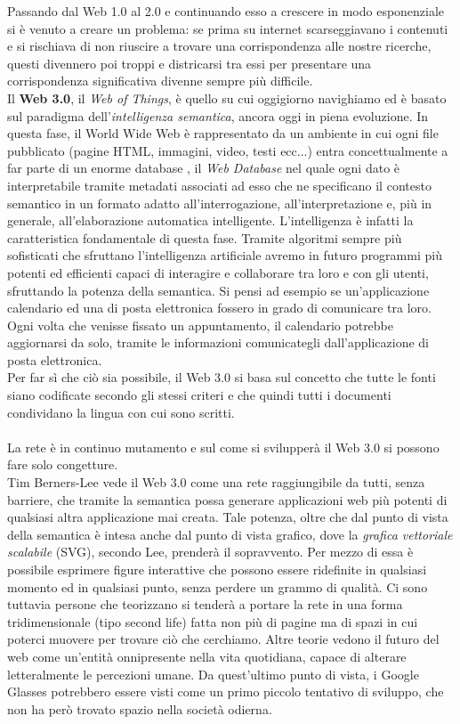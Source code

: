 \documentclass[a4paper, 11pt, oneside]{book}
\theoremstyle{plain}
\begin{document}
Passando dal Web 1.0 al 2.0 e continuando esso a crescere in modo esponenziale si è venuto a creare un problema: se prima su internet scarseggiavano i contenuti e si rischiava di non riuscire a trovare una corrispondenza alle nostre ricerche, questi divennero poi troppi e districarsi tra essi per presentare una corrispondenza significativa divenne sempre più difficile.\\
Il \textbf{Web 3.0}, il \textit{Web of Things}, è quello su cui oggigiorno navighiamo ed è basato sul paradigma dell'\textit{intelligenza semantica}, ancora oggi in piena evoluzione. In questa fase, il World Wide Web è rappresentato da un ambiente in cui ogni file pubblicato (pagine HTML, immagini, video, testi ecc...) entra concettualmente a far parte di un enorme database , il\textit{ Web Database} nel quale ogni dato è interpretabile tramite metadati associati ad esso che ne specificano il contesto semantico in un formato adatto all'interrogazione, all'interpretazione e, più in generale, all'elaborazione automatica intelligente. L'intelligenza è infatti la caratteristica fondamentale di questa fase. Tramite algoritmi sempre più sofisticati che sfruttano l'intelligenza artificiale avremo in futuro programmi più potenti ed efficienti capaci di interagire e collaborare tra loro e con gli utenti, sfruttando la potenza della semantica. Si pensi ad esempio se un'applicazione calendario ed una di posta elettronica fossero in grado di comunicare tra loro. Ogni volta che venisse fissato un appuntamento, il calendario potrebbe aggiornarsi da solo, tramite le informazioni comunicategli dall'applicazione di posta elettronica.\\ Per far sì che ciò sia possibile, il Web 3.0 si basa sul concetto che tutte le fonti siano codificate secondo gli stessi criteri e che quindi tutti i documenti condividano la lingua con cui sono scritti. \\\\
La rete è in continuo mutamento e sul come si svilupperà il Web 3.0 si possono fare solo congetture.\\Tim Berners-Lee vede il Web 3.0 come una rete raggiungibile da tutti, senza barriere, che tramite la semantica possa generare applicazioni web più potenti di qualsiasi altra applicazione mai creata. Tale potenza, oltre che dal punto di vista della semantica è intesa anche dal punto di vista grafico, dove la \textit{grafica vettoriale scalabile} (SVG), secondo Lee, prenderà il sopravvento. Per mezzo di essa è possibile esprimere figure interattive che possono essere ridefinite in qualsiasi momento ed in qualsiasi punto, senza perdere un grammo di qualità. Ci sono tuttavia persone che teorizzano si tenderà a portare la rete in una forma tridimensionale (tipo second life) fatta non più di pagine ma di spazi in cui poterci muovere per trovare ciò che cerchiamo. Altre teorie vedono il futuro del web come un'entità onnipresente nella vita quotidiana, capace di alterare letteralmente le percezioni umane. Da quest'ultimo punto di vista, i Google Glasses potrebbero essere visti come un primo piccolo tentativo di sviluppo, che non ha però trovato spazio nella società odierna. 
\end{document}
